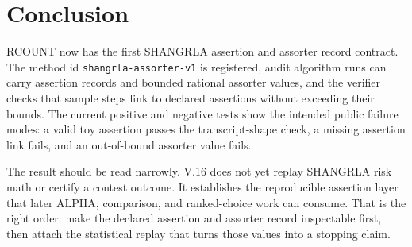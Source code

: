\section{Conclusion}

RCOUNT now has the first SHANGRLA assertion and assorter record contract. The
method id \texttt{shangrla-assorter-v1} is registered, audit algorithm runs can
carry assertion records and bounded rational assorter values, and the verifier
checks that sample steps link to declared assertions without exceeding their
bounds. The current positive and negative tests show the intended public
failure modes: a valid toy assertion passes the transcript-shape check, a
missing assertion link fails, and an out-of-bound assorter value fails.

The result should be read narrowly. V.16 does not yet replay SHANGRLA risk math
or certify a contest outcome. It establishes the reproducible assertion layer
that later ALPHA, comparison, and ranked-choice work can consume. That is the
right order: make the declared assertion and assorter record inspectable first,
then attach the statistical replay that turns those values into a stopping
claim.
